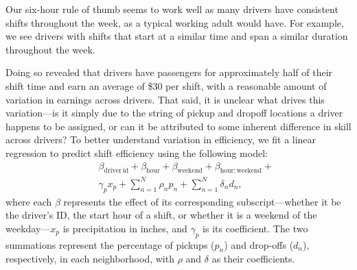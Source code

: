 \documentclass[twocolumn]{article}
\begin{document}
Our six-hour rule of thumb seems to work well as many drivers have consistent shifts throughout the week, as a typical working adult 
would have. For example, we see drivers with shifts that start at a similar time and span a similar duration throughout the week.



Doing so revealed that drivers have passengers for approximately half of their shift time and earn an average of \$30 per shift, with a reasonable amount of variation in earnings across drivers.
That said, it is unclear what drives this variation---is it simply due to the string of pickup and dropoff locations a driver happens to be assigned, or can it be attributed to some inherent difference in skill across drivers?
To better understand variation in efficiency, we fit a linear regression to predict shift efficiency using the following model:
\begin{eqnarray*}
&& \beta_{\mathrm{driver~id}} + \beta_{\mathrm{hour}} + \beta_{\mathrm{weekend}} + \beta_{\mathrm{hour:weekend}} + \\
  & & \gamma_p x_p + \sum_{n=1}^N \rho_n p_n + \sum_{n=1}^N \delta_n d_n,
\end{eqnarray*}
where each $\beta$ represents the effect of its corresponding subscript---whether it be the driver's ID, the start hour of a shift, or whether it is a weekend of the weekday---$x_p$ is precipitation in inches, and $\gamma_p$ is its coefficient. The two summations represent the percentage of pickups ($p_n$) and drop-offs ($d_n$), respectively, in each neighborhood, with $\rho$ and $\delta$ as their coefficients.
\end{document}
